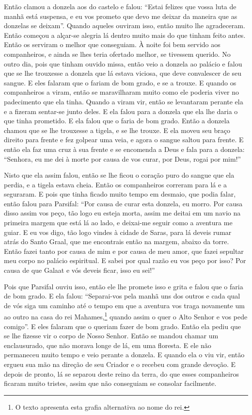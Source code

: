 Então clamou a donzela aos do castelo e falou: ``Estai felizes que vossa luta de
manhã está suspensa, e eu vos prometo que devo me deixar da maneira que as
donzelas se deixam”. Quando aqueles ouviram isso, então muito lhe agradeceram.
Então começou a alçar-se alegria lá dentro muito mais do que tinham feito antes.
Então os serviram o melhor que conseguiam. À noite foi bem servido aos
companheiros, e ainda se lhes teria ofertado melhor, se tivessem querido. No
outro dia, pois que tinham ouvido missa, então veio a donzela ao palácio e
falou que se lhe trouxesse a donzela que lá estava viciosa, que deve
convalescer de seu sangue. E eles falaram que o fariam de bom grado, e se a
trouxe. E quando os companheiros a viram, então se maravilharam muito como ele
poderia viver no padecimento que ela tinha. Quando a viram vir, então se
levantaram perante ela e a fizeram sentar-se junto deles. E ela falou para a
donzela que ela lhe daria o que tinha prometido. E ela falou que o faria de bom
grado. Então a donzela chamou que se lhe trouxesse a tigela, e se lhe trouxe. E
ela moveu seu braço direito para frente e fez golpear uma veia, e agora o
sangue saltou para frente. E então ela faz uma cruz à sua frente e se encomenda
a Deus e fala para a donzela: “Senhora, eu me dei à morte por causa de vos
curar, por Deus, rogai por mim!”

Nisto que ela assim falou, então se lhe ficou o coração puro do sangue que ela
perdia, e a tigela estava cheia. Então os companheiros correram para lá e a
seguraram. E pois que tinha ficado muito tempo em desmaio, que podia falar,
então falou para Parsifal: “Por causa de curar esta donzela, eu morro. Por
causa disso assim vos peço, tão logo eu esteja morta, assim me deitai em um
navio na primeira margem que está lá ao lado, e deixai-me seguir como a
aventura me guiar. E eu vos digo, tão logo vindes à cidade de Saras, para lá
deveis rumar atrás do Santo Graal, que me encontrais então na margem, abaixo da
torre. Então fazei tanto por causa de mim e por causa de meu amor, que fazei
sepultar meu corpo no palácio espiritual. E sabei por qual razão eu vos peço
por isso? Por causa de que Galaat e vós deveis ficar, isso eu sei!”

Pois que Parsifal ouviu isso, então ele lhe promete isso e grita e falou que o
faria de bom grado. E ela falou: “Separai-vos pela manhã uns dos outros e cada
qual de vós siga um caminho até o tempo em que a aventura vos traga novamente
um ao outro na casa do rei Mahames,\footnote{ O texto apresenta
esta grafia alternativa ao nome do rei.}  quando assim o quer o
Alto Senhor e vos pede comigo”. E eles falaram que o queriam fazer de bom
grado. Então ela pediu que se lhe fizesse vir o corpo de Nosso Senhor. Então se
mandou chamar um enclausurado, que não morava longe de lá, em uma floresta. E
ele não permaneceu muito tempo e veio perante a donzela. E quando ela o viu
vir, então ergueu sua mão na direção de seu Criador e o recebeu com grande
devoção. E depois de pronto, lá se separou deste reino da terra, do que esses
companheiros ficaram muito tristes, assim que não conseguiam se consolar
facilmente.

